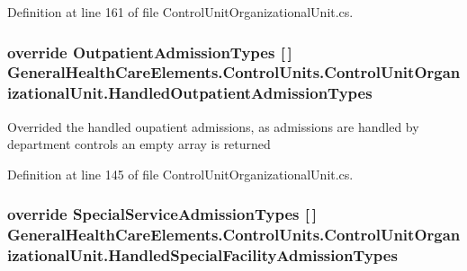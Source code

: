 Definition at line 161 of file Control\+Unit\+Organizational\+Unit.\+cs.

\subsubsection[{\texorpdfstring{Handled\+Outpatient\+Admission\+Types}{HandledOutpatientAdmissionTypes}}]{\setlength{\rightskip}{0pt plus 5cm}override {\bf Outpatient\+Admission\+Types} \mbox{[}$\,$\mbox{]} General\+Health\+Care\+Elements.\+Control\+Units.\+Control\+Unit\+Organizational\+Unit.\+Handled\+Outpatient\+Admission\+Types\hspace{0.3cm}{\ttfamily [get]}}\hypertarget{class_general_health_care_elements_1_1_control_units_1_1_control_unit_organizational_unit_a71c87e0c6c3bc2cd8c541a148873e080}{}\label{class_general_health_care_elements_1_1_control_units_1_1_control_unit_organizational_unit_a71c87e0c6c3bc2cd8c541a148873e080}


Overrided the handled oupatient admissions, as admissions are handled by department controls an empty array is returned 



Definition at line 145 of file Control\+Unit\+Organizational\+Unit.\+cs.

\subsubsection[{\texorpdfstring{Handled\+Special\+Facility\+Admission\+Types}{HandledSpecialFacilityAdmissionTypes}}]{\setlength{\rightskip}{0pt plus 5cm}override {\bf Special\+Service\+Admission\+Types} \mbox{[}$\,$\mbox{]} General\+Health\+Care\+Elements.\+Control\+Units.\+Control\+Unit\+Organizational\+Unit.\+Handled\+Special\+Facility\+Admission\+Types\hspace{0.3cm}{\ttfamily [get]}}\hypertarget{class_general_health_care_elements_1_1_control_units_1_1_control_unit_organizational_unit_a68a3bc497c0870fcc76866e1e762d513}{}\label{class_general_health_care_elements_1_1_control_units_1_1_control_unit_organizational_unit_a68a3bc497c0870fcc76866e1e762d513}


